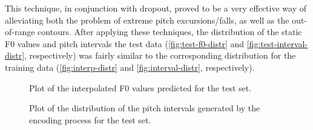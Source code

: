 This technique, in conjunction with dropout, proved to be a very effective way of alleviating both the problem of extreme pitch excursions/falls, as well as the out-of-range contours.
After applying these techniques, the distribution of the static \ac{F0} values and pitch intervals the test data (\autoref{fig:test-f0-distr} and \autoref{fig:test-interval-distr}, respectively) was fairly similar to the corresponding distribution for the training data (\autoref{fig:interp-distr} and \autoref{fig:interval-distr}, respectively).



\begin{figure}[h]
\centering
\resizebox{\textwidth}{!}{}
\caption[Interpolated \ac{F0} test distribution]{Plot of the interpolated \ac{F0} values predicted for the test set.}
\label{fig:test-f0-distr}
\end{figure}


\begin{figure}[h]
\centering
\resizebox{\textwidth}{!}{}
\caption[Pitch interval test distribution]{Plot of the distribution of the pitch intervals generated by the encoding process for the test set.}
\label{fig:test-interval-distr}
\end{figure}
